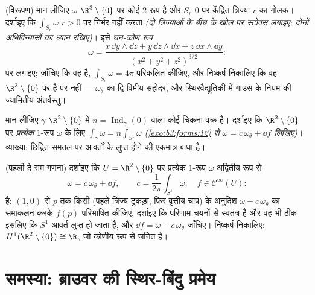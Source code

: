 \begin{exercise}[$\star\star\star$]\label{exo:b3:forms:10}
(विरूपण) मान लीजिए $\omega$ $\R^3\setminus\{0\}$ पर कोई \emph{} $2$-रूप है
और $S_r$ $0$ पर केंद्रित त्रिज्या $r$ का गोलक। दर्शाइए कि
$\int_{S_r}\omega$ $r > 0$ पर निर्भर नहीं करता \emph{(दो त्रिज्याओं के बीच के
खोल पर स्टोक्स लगाइए; दोनों  अभिविन्यासों का ध्यान रखिए)}।
इसे \emph{घन-कोण रूप}
\[
\omega = \frac{x\,\dd y\wedge\dd z + y\,\dd z\wedge\dd x +
z\,\dd x\wedge\dd y}{(x^2 + y^2 + z^2)^{3/2}} :
\]
पर लगाइए; जाँचिए कि वह  है, $\int_{S_r}\omega = 4\pi$ परिकलित कीजिए, और निष्कर्ष
निकालिए कि वह $\R^3\setminus\{0\}$ पर  है पर  नहीं --- $\omega_\theta$ का
द्वि-विमीय सहोदर, और स्थिरवैद्युतिकी में गाउस के नियम की ज्यामितीय
अंतर्वस्तु।
\end{exercise}

\begin{exercise}[$\star\star$]\label{exo:b3:forms:11}
मान लीजिए $\gamma$ $\R^2\setminus\{0\}$ में $n = \operatorname{Ind}_\gamma(0)$ वाला कोई चिकना  वक्र है।
दर्शाइए कि $\R^2\setminus\{0\}$ पर \emph{प्रत्येक}  $1$-रूप $\omega$ के लिए
$\int_\gamma\omega = n\int_{S^1}\omega$ \emph{(\cref{exo:b3:forms:12} से $\omega = c\,\omega_\theta
+ \dd f$ लिखिए)}। व्याख्या: छिद्रित समतल पर
आवर्तों के लुप्त होने की एकमात्र बाधा  है।
\end{exercise}

\begin{exercise}[$\star\star\star$]\label{exo:b3:forms:12}
(पहली दे राम गणना) दर्शाइए कि $U = \R^2\setminus\{0\}$ पर प्रत्येक  $1$-रूप
$\omega$ अद्वितीय रूप से
\[
\omega = c\,\omega_\theta + \dd f,
\qquad c = \frac1{2\pi}\int_{S^1}\omega,\quad f \in
\mathcal C^\infty(U) :
\]
है: $(1,0)$ से $p$ तक किसी  (पहले त्रिज्य टुकड़ा, फिर वृत्तीय
चाप) के अनुदिश $\omega - c\,\omega_\theta$ का समाकलन करके $f(p)$ परिभाषित कीजिए, दर्शाइए
कि परिणाम चयनों से स्वतंत्र है और वह भी ठीक इसलिए कि $S^1$-आवर्त
लुप्त हो जाता है, और $\dd
f = \omega - c\,\omega_\theta$ जाँचिए। निष्कर्ष निकालिए: $H^1(\R^2\setminus\{0\}) \cong \R$, जो
कोणीय रूप से जनित है।
\end{exercise}

\section{समस्या: ब्राउवर की स्थिर-बिंदु प्रमेय}

